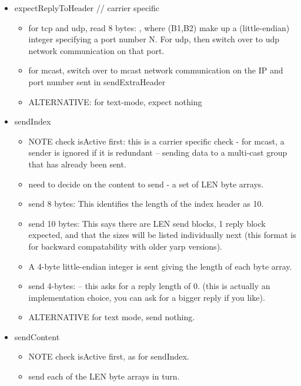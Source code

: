 \begin{itemize}
  \item expectReplyToHeader    // carrier specific
    \begin{itemize}
      \item for tcp and udp, read 8 bytes:  ,
         where
	(B1,B2) make up a (little-endian) integer specifying a port number N.
	For udp, then switch over to udp network communication on that port.
      \item for mcast, switch over to mcast network communication on the IP and
	port number sent in sendExtraHeader
      \item ALTERNATIVE: for text-mode, expect nothing
    \end{itemize}

  \item sendIndex

    \begin{itemize}
    \item NOTE check isActive first: this is a carrier specific check
    - for mcast, a sender is ignored if it is redundant -- sending
    data to a multi-cast group that has already been sent.
    \item need to decide on the content to send - a set of LEN byte arrays.
    \item send 8 bytes: 
      This identifies the length of the index header as 10.
    \item send 10 bytes: 
      This says there are LEN send blocks, 1 reply block expected,
      and that the sizes will be listed individually next (this
      format is for backward compatability with older yarp versions).
    \item A 4-byte little-endian integer is sent giving the length of
      each byte array.
    \item send 4-bytes:  -- this asks for a reply length of 0.
      (this is actually an implementation choice, you can ask for a bigger
      reply if you like).
    \item ALTERNATIVE for text mode, send nothing.
    \end{itemize}

  \item sendContent

    \begin{itemize}
      \item NOTE check isActive first, as for sendIndex.
      \item send each of the LEN byte arrays in turn.
    \end{itemize}


\end{itemize}
